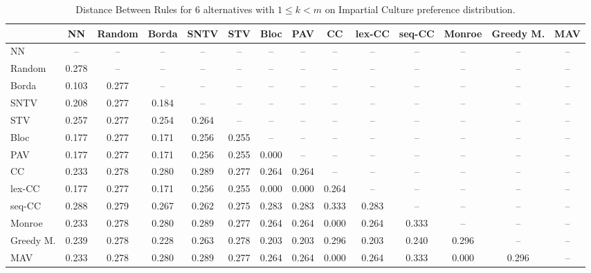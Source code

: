 
\begin{table*}
\centering
\begin{tabular}{lccccccccccccc}
\toprule
 & NN & Random & Borda & SNTV & STV & Bloc & PAV & CC & lex-CC & seq-CC & Monroe & Greedy M. & MAV \\
\midrule
NN & -- & -- & -- & -- & -- & -- & -- & -- & -- & -- & -- & -- & -- \\
Random & 0.278 & -- & -- & -- & -- & -- & -- & -- & -- & -- & -- & -- & -- \\
Borda & 0.103 & 0.277 & -- & -- & -- & -- & -- & -- & -- & -- & -- & -- & -- \\
SNTV & 0.208 & 0.277 & 0.184 & -- & -- & -- & -- & -- & -- & -- & -- & -- & -- \\
STV & 0.257 & 0.277 & 0.254 & 0.264 & -- & -- & -- & -- & -- & -- & -- & -- & -- \\
Bloc & 0.177 & 0.277 & 0.171 & 0.256 & 0.255 & -- & -- & -- & -- & -- & -- & -- & -- \\
PAV & 0.177 & 0.277 & 0.171 & 0.256 & 0.255 & 0.000 & -- & -- & -- & -- & -- & -- & -- \\
CC & 0.233 & 0.278 & 0.280 & 0.289 & 0.277 & 0.264 & 0.264 & -- & -- & -- & -- & -- & -- \\
lex-CC & 0.177 & 0.277 & 0.171 & 0.256 & 0.255 & 0.000 & 0.000 & 0.264 & -- & -- & -- & -- & -- \\
seq-CC & 0.288 & 0.279 & 0.267 & 0.262 & 0.275 & 0.283 & 0.283 & 0.333 & 0.283 & -- & -- & -- & -- \\
Monroe & 0.233 & 0.278 & 0.280 & 0.289 & 0.277 & 0.264 & 0.264 & 0.000 & 0.264 & 0.333 & -- & -- & -- \\
Greedy M. & 0.239 & 0.278 & 0.228 & 0.263 & 0.278 & 0.203 & 0.203 & 0.296 & 0.203 & 0.240 & 0.296 & -- & -- \\
MAV & 0.233 & 0.278 & 0.280 & 0.289 & 0.277 & 0.264 & 0.264 & 0.000 & 0.264 & 0.333 & 0.000 & 0.296 & -- \\
\bottomrule
\end{tabular}

\caption{Distance Between Rules for 6 alternatives with $1 \leq k < m$ on Impartial Culture preference distribution.}
\end{table*}
